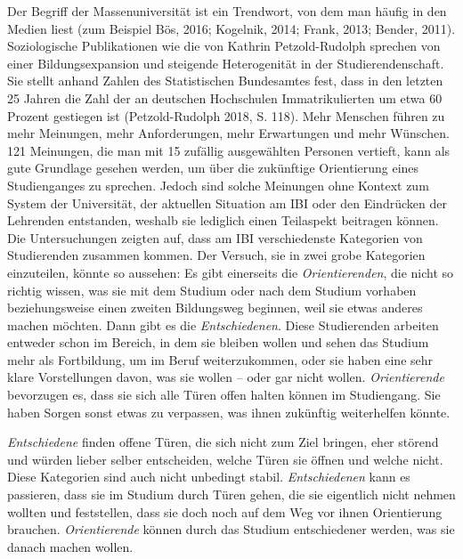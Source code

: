 \documentclass[a4paper,
fontsize=11pt,
oneside,
numbers=noperiodatend,
parskip=half-,
bibliography=totoc,
final
]{scrartcl}
\begin{document}
Der Begriff der Massenuniversität ist ein Trendwort, von dem man häufig
in den Medien liest (zum Beispiel Bös, 2016; Kogelnik, 2014; Frank,
2013; Bender, 2011). Soziologische Publikationen wie die von Kathrin
Petzold-Rudolph sprechen von einer Bildungsexpansion und steigende
Heterogenität in der Studierendenschaft. Sie stellt anhand Zahlen des
Statistischen Bundesamtes fest, dass in den letzten 25 Jahren die Zahl
der an deutschen Hochschulen Immatrikulierten um etwa 60 Prozent
gestiegen ist (Petzold-Rudolph 2018, S. 118). Mehr Menschen führen zu
mehr Meinungen, mehr Anforderungen, mehr Erwartungen und mehr Wünschen.
121 Meinungen, die man mit 15 zufällig ausgewählten Personen vertieft,
kann als gute Grundlage gesehen werden, um über die zukünftige
Orientierung eines Studienganges zu sprechen. Jedoch sind solche
Meinungen ohne Kontext zum System der Universität, der aktuellen
Situation am IBI oder den Eindrücken der Lehrenden entstanden, weshalb
sie lediglich einen Teilaspekt beitragen können. Die Untersuchungen
zeigten auf, dass am IBI verschiedenste Kategorien von Studierenden
zusammen kommen. Der Versuch, sie in zwei grobe Kategorien einzuteilen,
könnte so aussehen: Es gibt einerseits die \emph{Orientierenden}, die
nicht so richtig wissen, was sie mit dem Studium oder nach dem Studium
vorhaben beziehungsweise einen zweiten Bildungsweg beginnen, weil sie
etwas anderes machen möchten. Dann gibt es die \emph{Entschiedenen}.
Diese Studierenden arbeiten entweder schon im Bereich, in dem sie
bleiben wollen und sehen das Studium mehr als Fortbildung, um im Beruf
weiterzukommen, oder sie haben eine sehr klare Vorstellungen davon, was
sie wollen -- oder gar nicht wollen. \emph{Orientierende} bevorzugen es,
dass sie sich alle Türen offen halten können im Studiengang. Sie haben
Sorgen sonst etwas zu verpassen, was ihnen zukünftig weiterhelfen
könnte.

\emph{Entschiedene} finden offene Türen, die sich nicht zum Ziel
bringen, eher störend und würden lieber selber entscheiden, welche Türen
sie öffnen und welche nicht. Diese Kategorien sind auch nicht unbedingt
stabil. \emph{Entschiedenen} kann es passieren, dass sie im Studium
durch Türen gehen, die sie eigentlich nicht nehmen wollten und
feststellen, dass sie doch noch auf dem Weg vor ihnen Orientierung
brauchen. \emph{Orientierende} können durch das Studium entschiedener
werden, was sie danach machen wollen.
\end{document}
